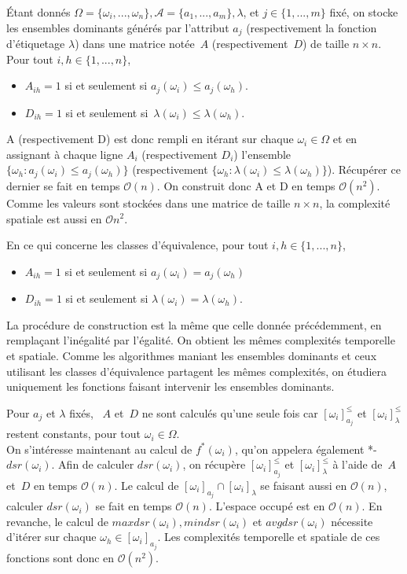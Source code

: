 \documentclass[a4paper]{article}
\begin{document}
Étant donnés $\Omega = \{\omega_i, ... , \omega_n\}, \mathcal{A} = \{a_1, ...,
a_m\}, \lambda$, et $j \in \{1, ..., m\}$ fixé, on stocke les ensembles
dominants générés par l'attribut $a_j$ (respectivement la fonction d'étiquetage $\lambda$) dans une matrice notée~$A$ (respectivement~$D$) de taille $n \times n$. Pour tout $i,
h \in \{1,...,n\}$,
\begin{itemize} 
    \item $A_{ih} = 1$ si et seulement si $a_j(\omega_i) \leq
    a_j(\omega_h)$.
    \item $D_{ih}= 1$ si et seulement si~$\lambda(\omega_i) \leq \lambda(\omega_h)$.
\end{itemize}
A (respectivement D) est donc rempli en itérant sur chaque $\omega_i \in \Omega$
et en assignant à chaque ligne $A_i$ (respectivement $D_i$) l'ensemble
$\{\omega_h : a_j(\omega_i) \leq a_j(\omega_h)\}$ (respectivement $\{\omega_h :
\lambda(\omega_i) \leq \lambda(\omega_h)\}$). Récupérer ce dernier se fait en
temps $\mathcal{O}(n)$. On construit donc A et D en temps $\mathcal{O}(n^2)$.
Comme les valeurs sont stockées dans une matrice de taille $n \times n$, la
complexité spatiale est aussi en $\mathcal{O}{n^2}$.

En ce qui concerne les classes d'équivalence, pour tout $i, h \in \{1,...,n\}$,
\begin{itemize}
    \item $A_{ih} = 1$ si et seulement si $a_j(\omega_i) = a_j(\omega_h)$
    \item $D_{ih} = 1$ si et seulement si $\lambda(\omega_i) = \lambda(\omega_h)$. 
\end{itemize}
La procédure de construction est la même que celle donnée
précédemment, en remplaçant l'inégalité par l'égalité. On obtient les mêmes
complexités temporelle et spatiale. Comme les algorithmes maniant les ensembles
dominants et ceux utilisant les classes d'équivalence partagent les mêmes
complexités, on étudiera uniquement les fonctions faisant intervenir les
ensembles dominants. 

Pour $a_j$ et $\lambda$ fixés, ~$A$ et~$D$ ne sont calculés qu'une seule fois car
$[\omega_i]^{\leq}_{a_j}$ et $[\omega_i]^{\leq}_{\lambda}$ restent constants,
pour tout $\omega_i \in \Omega$. \\

On s'intéresse maintenant au calcul de $f^*(\omega_i)$, qu'on appelera également
*-$dsr(\omega_i)$.
Afin de calculer $dsr(\omega_i)$, on récupère $[\omega_i]^{\leq}_{a_j}$ et
$[\omega_i]^{\leq}_{\lambda}$ à l'aide de~$A$ et~$D$ en temps $\mathcal{O}(n)$. Le calcul de
$[\omega_i]_{a_j} \cap [\omega_i]_{\lambda}$ se faisant aussi en $\mathcal{O}(n)$,
calculer $dsr(\omega_i)$ se fait en temps $\mathcal{O}(n)$. L'espace occupé est
en $\mathcal{O}(n)$.
En revanche, le calcul de $maxdsr(\omega_i), mindsr(\omega_i)$ et
$avgdsr(\omega_i)$ nécessite d'itérer sur chaque $\omega_h \in
[\omega_i]_{a_j}$. Les complexités temporelle et spatiale de ces fonctions sont
donc en $\mathcal{O}(n^2)$. \\
\end{document}
